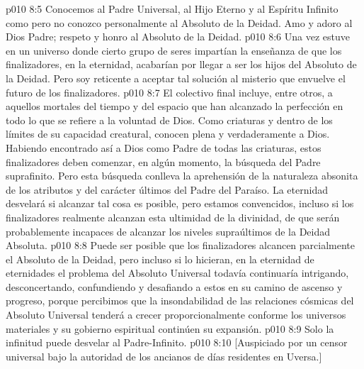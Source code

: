 \vs p010 8:5 Conocemos al Padre Universal, al Hijo Eterno y al Espíritu Infinito como  pero no conozco personalmente al Absoluto de la Deidad. Amo y adoro al Dios Padre; respeto y honro al Absoluto de la Deidad.
\vs p010 8:6 \pc Una vez estuve en un universo donde cierto grupo de seres impartían la enseñanza de que los finalizadores, en la eternidad, acabarían por llegar a ser los hijos del Absoluto de la Deidad. Pero soy reticente a aceptar tal solución al misterio que envuelve el futuro de los finalizadores.
\vs p010 8:7 El colectivo final incluye, entre otros, a aquellos mortales del tiempo y del espacio que han alcanzado la perfección en todo lo que se refiere a la voluntad de Dios. Como criaturas y dentro de los límites de su capacidad creatural, conocen plena y verdaderamente a Dios. Habiendo encontrado así a Dios como Padre de todas las criaturas, estos finalizadores deben comenzar, en algún momento, la búsqueda del Padre suprafinito. Pero esta búsqueda conlleva la aprehensión de la naturaleza absonita de los atributos y del carácter últimos del Padre del Paraíso. La eternidad desvelará si alcanzar tal cosa es posible, pero estamos convencidos, incluso si los finalizadores realmente alcanzan esta ultimidad de la divinidad, de que serán probablemente incapaces de alcanzar los niveles supraúltimos de la Deidad Absoluta.
\vs p010 8:8 Puede ser posible que los finalizadores alcancen parcialmente el Absoluto de la Deidad, pero incluso si lo hicieran, en la eternidad de eternidades el problema del Absoluto Universal todavía continuaría intrigando, desconcertando, confundiendo y desafiando a estos en su camino de ascenso y progreso, porque percibimos que la insondabilidad de las relaciones cósmicas del Absoluto Universal tenderá a crecer proporcionalmente conforme los universos materiales y su gobierno espiritual continúen su expansión.
\vs p010 8:9 \pc Solo la infinitud puede desvelar al Padre\hyp{}Infinito.
\vsetoff
\vs p010 8:10 [Auspiciado por un censor universal bajo la autoridad de los ancianos de días residentes en Uversa.]
